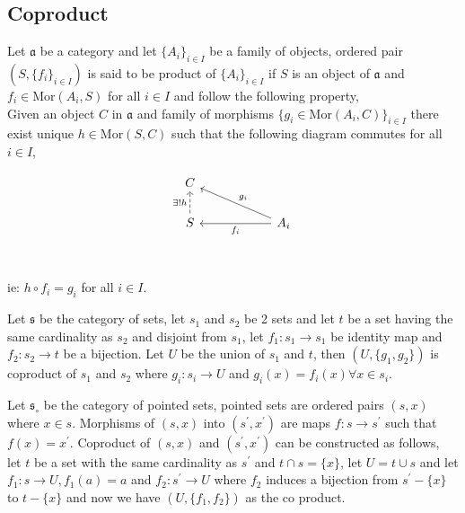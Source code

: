 \documentclass[11pt,a4paper]{colorart}
\def\mab{\mathfrak}
\def\oo{\circ}
\def\ra{\rightarrow}
\begin{document}
\subsection{Coproduct}

\begin{definition}
	Let $\mab{a}$ be a category and let $\{A_i\}_{i \in I}$ be a family of objects, ordered pair $(S,\{f_i\}_{i \in I})$ is said to be product of $\{A_i\}_{i \in I}$ if $S$ is an object of $\mab{a}$ and $f_i \in \text{Mor}(A_i,S)$ for all $i\in I$ and follow the following property,\\

	Given an object $C$ in $\mab{a}$ and family of morphisms $\{ g_i \in \text{Mor}(A_i,C) \}_{i\in I}$ there exist unique $h \in \text{Mor}(S,C)$ such that the following diagram commutes for all $i \in I$,

\[\begin{tikzcd}
	C \\
	S && {A_i} \\
	& {}
	\arrow["{{{\exists ! h}}}", dashed, from=2-1, to=1-1]
	\arrow["{{{g_i}}}"', from=2-3, to=1-1]
	\arrow["{{{f_i}}}", from=2-3, to=2-1]
\end{tikzcd}\]

ie: $h \oo f_i = g_i$ for all $i \in I$.

\end{definition}

\begin{example}
	Let $\mab{s}$ be the category of sets, let $s_1$ and $s_2$ be 2 sets and let $t$ be a set having the same cardinality as $s_2$ and disjoint from $s_1$, let $f_1 : s_1 \ra s_1$ be identity map and $f_2: s_2 \ra t$ be a bijection. Let $U$ be the union of $s_1$ and $t$, then $(U,\{g_1,g_2\})$ is coproduct of $s_1$ and $s_2$ where $g_i: s_i \ra U$ and $g_i(x) = f_i(x) \forall x \in s_i$.  
\end{example}

\begin{example}[]
	Let $\mab{s}_\oo$ be the category of pointed sets, pointed sets are ordered pairs $(s,x)$ where $x \in s$. Morphisms of $(s,x)$ into $(s^\prime,x^\prime)$ are maps $f: s \ra s^\prime$ such that $f(x) = x^\prime$. Coproduct of $(s,x)$ and $(s^\prime,x^\prime)$ can be constructed as follows,\\ 
	let $t$ be a set with the same cardinality as $s^\prime$ and $t \cap s = \{x\}$, let $U = t \cup s$ and let $f_1 : s \ra U, f_1(a) = a$ and $f_2: s^\prime \ra U$ where $f_2$ induces a bijection from $s^\prime - \{x\}$ to $t - \{x\}$ and now we have $(U, \{f_1, f_2\})$ as the co product.
\end{example}
\end{document}
